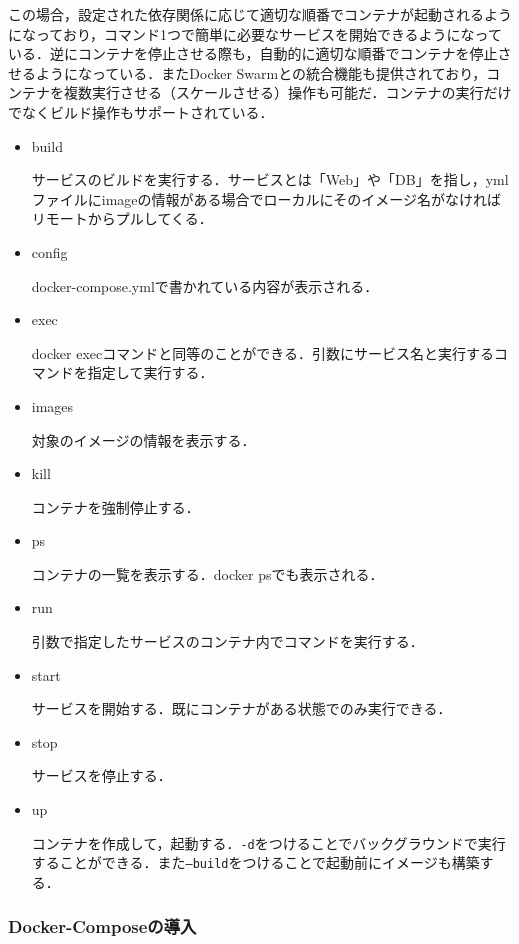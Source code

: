 この場合，設定された依存関係に応じて適切な順番でコンテナが起動されるようになっており，コマンド1つで簡単に必要なサービスを開始できるようになっている．逆にコンテナを停止させる際も，自動的に適切な順番でコンテナを停止させるようになっている．またDocker Swarmとの統合機能も提供されており，コンテナを複数実行させる（スケールさせる）操作も可能だ．コンテナの実行だけでなくビルド操作もサポートされている．

\begin{itemize}
\item build

サービスのビルドを実行する．サービスとは「Web」や「DB」を指し，ymlファイルにimageの情報がある場合でローカルにそのイメージ名がなければリモートからプルしてくる．

\item config

docker-compose.ymlで書かれている内容が表示される．

\item exec

docker execコマンドと同等のことができる．引数にサービス名と実行するコマンドを指定して実行する．

\item images

対象のイメージの情報を表示する．

\item kill

コンテナを強制停止する．

\item ps

コンテナの一覧を表示する．docker psでも表示される．

\item run

引数で指定したサービスのコンテナ内でコマンドを実行する．

\item start

サービスを開始する．既にコンテナがある状態でのみ実行できる．

\item stop

サービスを停止する．

\item up

コンテナを作成して，起動する．\texttt{-d}をつけることでバックグラウンドで実行することができる．また\texttt{--build}をつけることで起動前にイメージも構築する．
\end{itemize}

\subsubsection{Docker-Composeの導入}

